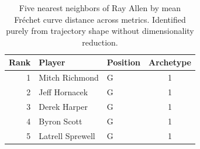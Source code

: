 \begin{table}[htbp]
  \centering\small
  \begin{tabular}{rllc}
    \toprule
    Rank & Player & Position & Archetype \\
    \midrule
    1 & Mitch Richmond & G & 1 \\
    2 & Jeff Hornacek & G & 1 \\
    3 & Derek Harper & G & 1 \\
    4 & Byron Scott & G & 1 \\
    5 & Latrell Sprewell & G & 1 \\
    \bottomrule
  \end{tabular}
  \caption{Five nearest neighbors of Ray Allen by mean Fr\'{e}chet curve distance across metrics. Identified purely from trajectory shape without dimensionality reduction.}
  \label{tab:Ray_Allen_frechet_curve_neighbors}
\end{table}

